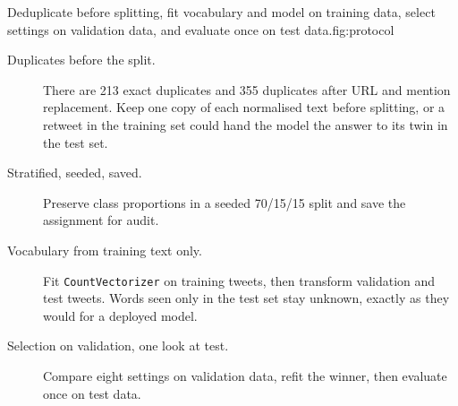 \begin{utpfig}{Deduplicate before splitting, fit vocabulary and model on training data, select settings on validation data, and evaluate once on test data.}{fig:protocol}
\end{utpfig}

\begin{description}
  \item[Duplicates before the split.] There are 213 exact duplicates and 355 duplicates after URL and mention replacement. Keep one copy of each normalised text before splitting, or a retweet in the training set could hand the model the answer to its twin in the test set.
  \item[Stratified, seeded, saved.] Preserve class proportions in a seeded 70/15/15 split and save the assignment for audit.
  \item[Vocabulary from training text only.] Fit \texttt{CountVectorizer} on training tweets, then transform validation and test tweets. Words seen only in the test set stay unknown, exactly as they would for a deployed model.
  \item[Selection on validation, one look at test.] Compare eight settings on validation data, refit the winner, then evaluate once on test data.
\end{description}

